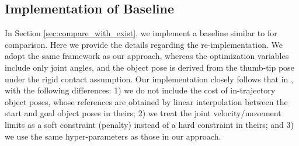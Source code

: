 {\subsection{Implementation of Baseline}

In Section \ref{sec:compare_with_exist}, we implement a baseline similar to \cite{sundaralingam2017relaxed} for comparison. Here we provide the details regarding the re-implementation. 
We adopt the same framework as our approach, whereas the optimization variables include only joint angles, and the object pose is derived from the thumb-tip pose under the rigid contact assumption. 
Our implementation closely follows that in \cite{sundaralingam2017relaxed}, with the following differences: 
1) we do not include the cost of in-trajectory object poses, whose references are obtained by linear interpolation between the start and goal object poses in theirs; 
2) we treat the joint velocity/movement limits as a soft constraint (penalty) instead of a hard constraint in theirs;
and 3) we use the same hyper-parameters as those in our approach.


} %